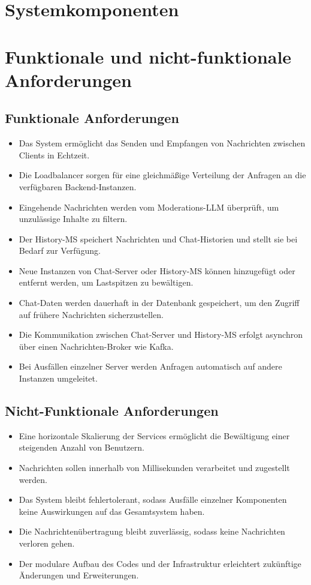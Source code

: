 \documentclass[12pt]{report}
\begin{document}
\section{Systemkomponenten}



\section{Funktionale und nicht-funktionale Anforderungen}

\subsection{Funktionale Anforderungen}
\begin{itemize}
	\item Das System ermöglicht das Senden und Empfangen von Nachrichten zwischen Clients in Echtzeit.
	\item Die Loadbalancer sorgen für eine gleichmäßige Verteilung der Anfragen an die verfügbaren Backend-Instanzen.
	\item Eingehende Nachrichten werden vom Moderations-LLM überprüft, um unzulässige Inhalte zu filtern.
	\item Der History-MS speichert Nachrichten und Chat-Historien und stellt sie bei Bedarf zur Verfügung.
	\item Neue Instanzen von Chat-Server oder History-MS können hinzugefügt oder entfernt werden, um Lastspitzen zu bewältigen.
	\item Chat-Daten werden dauerhaft in der Datenbank gespeichert, um den Zugriff auf frühere Nachrichten sicherzustellen.
	\item Die Kommunikation zwischen Chat-Server und History-MS erfolgt asynchron über einen Nachrichten-Broker wie Kafka.
	\item Bei Ausfällen einzelner Server werden Anfragen automatisch auf andere Instanzen umgeleitet.
\end{itemize}

\subsection{Nicht-Funktionale Anforderungen}
\begin{itemize}
	\item Eine horizontale Skalierung der Services ermöglicht die Bewältigung einer steigenden Anzahl von Benutzern.
	\item Nachrichten sollen innerhalb von Millisekunden verarbeitet und zugestellt werden.
	\item Das System bleibt fehlertolerant, sodass Ausfälle einzelner Komponenten keine Auswirkungen auf das Gesamtsystem haben.
	\item Die Nachrichtenübertragung bleibt zuverlässig, sodass keine Nachrichten verloren gehen.
	\item Der modulare Aufbau des Codes und der Infrastruktur erleichtert zukünftige Änderungen und Erweiterungen.
\end{itemize}
\end{document}
